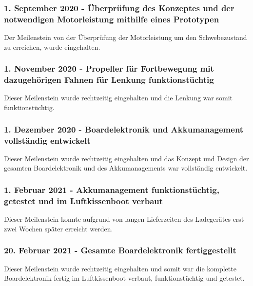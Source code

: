 
\subsubsection*{1. September 2020 - Überprüfung des Konzeptes und der notwendigen Motorleistung mithilfe eines Prototypen}
Der Meilenstein von der Überprüfung der Motorleistung um den Schwebezustand zu erreichen, wurde eingehalten.  

\subsubsection*{1. November 2020 - Propeller für Fortbewegung mit dazugehörigen Fahnen für Lenkung funktionstüchtig}
Dieser Meilenstein wurde rechtzeitig eingehalten und die Lenkung war somit funktionstüchtig. 

\subsubsection*{1. Dezember 2020 - Boardelektronik und  Akkumanagement vollständig entwickelt}
Dieser Meilenstein wurde rechtzeitig eingehalten und das Konzept und Design der gesamten Boardelektronik und des Akkumanagements war vollständig entwickelt. \\

\subsubsection*{1. Februar 2021 - Akkumanagement funktionstüchtig, getestet und im Luftkissenboot verbaut}
Dieser Meilenstein konnte aufgrund von langen Lieferzeiten des Ladegerätes erst zwei Wochen später erreicht werden.


\subsubsection*{20. Februar 2021 - Gesamte Boardelektronik fertiggestellt}
Dieser Meilenstein wurde rechtzeitig eingehalten und somit war die komplette Boardelektronik  fertig im Luftkissenboot verbaut, funktionstüchtig und getestet. 

